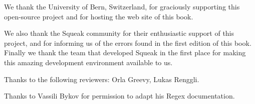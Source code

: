 \documentclass[a4paper,10pt,twoside]{book}
\begin{document}
We thank the University of Bern, Switzerland, for graciously supporting this open-source project and for hosting the web site of this book.

We also thank the Squeak community for their enthusiastic support of this project, and for informing us of the errors found in the first edition of this book.
Finally we thank the team that developed Squeak in the first place for making this amazing development environment available to us.


Thanks to the following reviewers:
Orla Greevy,
Lukas Renggli.

Thanks to Vassili Bykov for permission to adapt his Regex documentation.


\ifx\wholebook\relax\else
   
   
\end{document}
